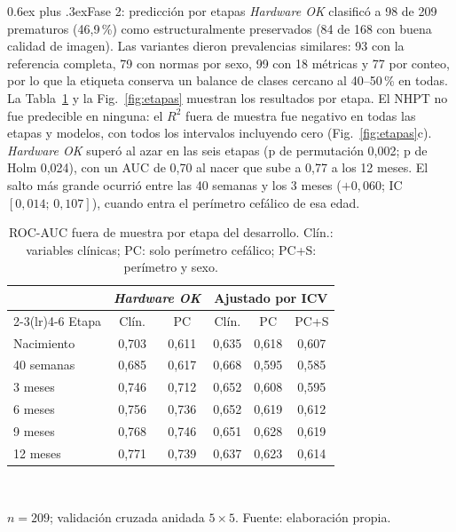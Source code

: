 \documentclass[conference,letterpaper,10pt]{IEEEtran}
\makeatletter
\def\subsection{\@startsection{subsection}{2}{\z@}{1.5ex plus 1ex minus .5ex}%
  {0.6ex plus .3ex}{\normalfont\normalsize\bfseries}}
\makeatother
\begin{document}
\subsection{Fase 2: predicción por etapas}
\emph{Hardware OK} clasificó a 98 de 209 prematuros (46,9\,\%) como estructuralmente preservados (84 de 168 con buena calidad de imagen). Las variantes dieron prevalencias similares: 93 con la referencia completa, 79 con normas por sexo, 99 con 18 métricas y 77 por conteo, por lo que la etiqueta conserva un balance de clases cercano al 40--50\,\% en todas. La Tabla~\ref{tab:etapas} y la Fig.~\ref{fig:etapas} muestran los resultados por etapa. El NHPT no fue predecible en ninguna: el $R^2$ fuera de muestra fue negativo en todas las etapas y modelos, con todos los intervalos incluyendo cero (Fig.~\ref{fig:etapas}c). \emph{Hardware OK} superó al azar en las seis etapas (p de permutación 0,002; p de Holm 0,024), con un AUC de 0,70 al nacer que sube a 0,77 a los 12 meses. El salto más grande ocurrió entre las 40 semanas y los 3 meses ($+0{,}060$; IC $[0{,}014;\,0{,}107]$), cuando entra el perímetro cefálico de esa edad.

\begin{table}[t]
\caption{ROC-AUC fuera de muestra por etapa del desarrollo. Clín.: variables clínicas; PC: solo perímetro cefálico; PC+S: perímetro y sexo.}
\label{tab:etapas}
\centering
\footnotesize
\setlength{\tabcolsep}{3.5pt}
\begin{tabular}{@{}lccccc@{}}
\toprule
& \multicolumn{2}{c}{\emph{Hardware OK}} & \multicolumn{3}{c}{Ajustado por ICV} \\
\cmidrule(lr){2-3}\cmidrule(lr){4-6}
Etapa & Clín. & PC & Clín. & PC & PC+S \\
\midrule
Nacimiento & 0,703 & 0,611 & 0,635 & 0,618 & 0,607 \\
40 semanas & 0,685 & 0,617 & 0,668 & 0,595 & 0,585 \\
3 meses & 0,746 & 0,712 & 0,652 & 0,608 & 0,595 \\
6 meses & 0,756 & 0,736 & 0,652 & 0,619 & 0,612 \\
9 meses & 0,768 & 0,746 & 0,651 & 0,628 & 0,619 \\
12 meses & 0,771 & 0,739 & 0,637 & 0,623 & 0,614 \\
\bottomrule
\end{tabular}\\[2pt]
\parbox{\columnwidth}{\scriptsize $n=209$; validación cruzada anidada $5\times5$. Fuente: elaboración propia.}
\end{table}
\end{document}
